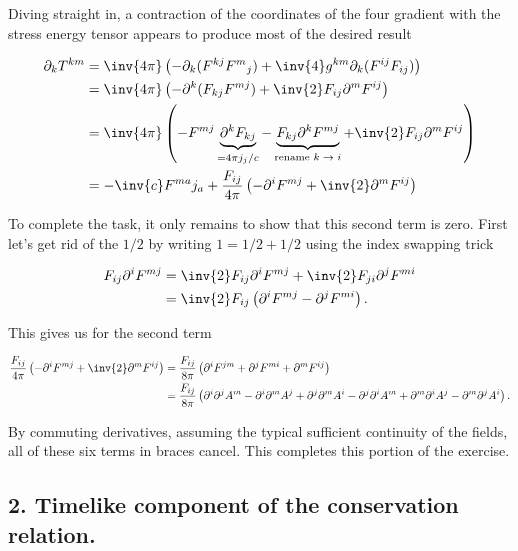 Diving straight in, a contraction of the coordinates of the four gradient with the stress energy tensor appears to produce most of the desired result

\begin{align*}
\partial_k T^{k m} 
&=
\inv{4 \pi} \left( 
-\partial_k( F^{k j} {F^{m}}_j ) 
+ \inv{4} g^{k m} \partial_k 
(F^{i j} F_{i j}) 
\right) \\
&=
\inv{4 \pi} \left( 
-\partial^k( F_{k j} F^{m j} ) + \inv{2} F_{i j} \partial^m F^{i j} 
\right) \\
&=
\inv{4 \pi} \left( 
-F^{m j} \underbrace{\partial^k F_{k j} }_{= 4 \pi j_j/c}
-\underbrace{F_{k j} \partial^k F^{m j} }_{\text{rename $k \rightarrow i$}}
+ \inv{2} F_{i j} \partial^m F^{i j} 
\right) \\
&=
- \inv{c} F^{m a} j_a
+\frac{F_{i j}}{4 \pi} \left( 
-\partial^i F^{m j} + \inv{2} \partial^m F^{i j} 
\right) \\
\end{align*}

To complete the task, it only remains to show that this second term is zero.  First let's get rid of the $1/2$ by writing $1 = 1/2 + 1/2$ using the index swapping trick

\begin{align*}
F_{i j} \partial^i F^{m j} 
&= 
\inv{2} F_{i j} \partial^i F^{m j} + \inv{2} F_{j i} \partial^j F^{m i} \\
&= 
\inv{2} F_{i j} \left( \partial^i F^{m j} - \partial^j F^{m i} \right).
\end{align*}

This gives us for the second term

\begin{align*}
\frac{F_{i j}}{4 \pi} \left( -\partial^i F^{m j} + \inv{2} \partial^m F^{i j} \right) 
&=
\frac{F_{i j}}{8 \pi} \left( \partial^i F^{j m} + \partial^j F^{m i} + \partial^m F^{i j} \right) \\
&=
\frac{F_{i j}}{8 \pi} \left( 
\partial^i \partial^j A^m
-\partial^i \partial^m A^j
+\partial^j \partial^m A^i
-\partial^j \partial^i A^m
+\partial^m \partial^i A^j
-\partial^m \partial^j A^i
\right).
\end{align*}

By commuting derivatives, assuming the typical sufficient continuity of the fields, all of these six terms in braces cancel.  This completes this portion of the exercise.

\subsection{2. Timelike component of the conservation relation.}

